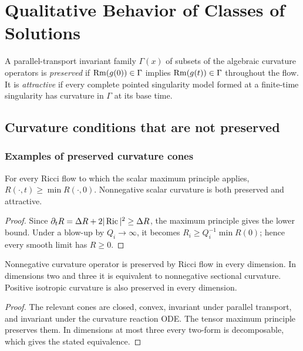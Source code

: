 \chapter[13]{Qualitative Behavior of Classes of Solutions}
\label{ch:chow-ii-qualitative-behavior}

A parallel-transport invariant family \(\Gamma(x)\) of subsets of the
algebraic curvature operators is \emph{preserved} if
\(\operatorname{Rm}(g(0))\in\Gamma\) implies \(\operatorname{Rm}(g(t))\in\Gamma\) throughout the flow.
It is \emph{attractive} if every complete pointed singularity model formed at
a finite-time singularity has curvature in \(\Gamma\) at its base time.

\section{Curvature conditions that are not preserved}

\subsection{Examples of preserved curvature cones}

\begin{example}
\label{ex:chow-ii-nonnegative-scalar-preserved-attractive}

For every Ricci flow to which the scalar maximum principle applies,
\(R(\cdot,t)\geq\min R(\cdot,0)\).  Nonnegative scalar curvature is both
preserved and attractive.
\end{example}
\begin{proof}
\sketch
{}
Since \(\partial_tR=\Delta R+2|\operatorname{Ric}|^2\geq\Delta R\), the maximum principle
gives the lower bound.  Under a blow-up by \(Q_i\to\infty\), it becomes
\(R_i\geq Q_i^{-1}\min R(0)\); hence every smooth limit has \(R\geq0\).
\end{proof}

\begin{example}
\label{ex:chow-ii-nonnegative-curvature-operator-preserved}

Nonnegative curvature operator is preserved by Ricci flow in every dimension.
In dimensions two and three it is equivalent to nonnegative sectional
curvature.  Positive isotropic curvature is also preserved in every dimension.
\end{example}
\begin{proof}
\sketch
{}
The relevant cones are closed, convex, invariant under parallel transport,
and invariant under the curvature reaction ODE.  The tensor maximum principle
preserves them.  In dimensions at most three every two-form is decomposable,
which gives the stated equivalence.
\end{proof}

